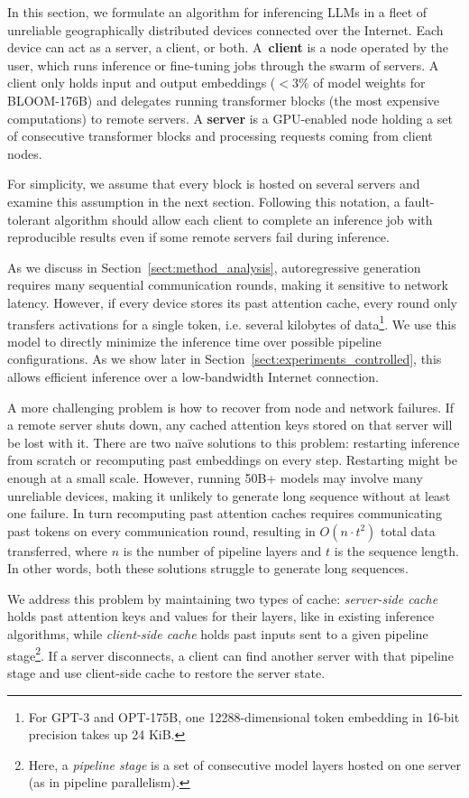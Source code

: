 In this section, we formulate an algorithm for inferencing LLMs in a fleet of unreliable geographically distributed devices connected over the Internet. Each device can act as a server, a client, or both. A~\textbf{client} is a node operated by the user, which runs inference or fine-tuning jobs through the swarm of servers. A client only holds input and output embeddings ($< 3\%$ of model weights for BLOOM-176B) and delegates running transformer blocks (the most expensive computations) to remote servers. A \textbf{server} is a GPU-enabled node holding a set of consecutive transformer blocks and processing requests coming from client nodes.

For simplicity, we assume that every block is hosted on several servers and examine this assumption in the next section. Following this notation, a fault-tolerant algorithm should allow each client to complete an inference job with reproducible results even if some remote servers fail during inference.

As we discuss in Section~\ref{sect:method_analysis}, autoregressive generation requires many sequential communication rounds, making it sensitive to network latency.
However, if every device stores its past attention cache, every round only transfers activations for a single token, i.e. several kilobytes of data\footnote{For GPT-3 and OPT-175B, one 12288-dimensional token embedding in 16-bit precision takes up 24 KiB.}. We use this model to directly minimize the inference time over possible pipeline configurations. As we show later in Section~\ref{sect:experiments_controlled}, this allows efficient inference over a low-bandwidth Internet connection.

A more challenging problem is how to recover from node and network failures. If a remote server shuts down, any cached attention keys stored on that server will be lost with it. There are two naïve solutions to this problem: restarting inference from scratch or recomputing past embeddings on every step. Restarting might be enough at a small scale. However, running 50B+ models may involve many unreliable devices, making it unlikely to generate long sequence without at least one failure. In turn recomputing past attention caches requires communicating past tokens on every communication round, resulting in $O(n \cdot t^2)$ total data transferred, where $n$ is the number of pipeline layers and $t$ is the sequence length. In other words, both these solutions struggle to generate long sequences.

We address this problem by maintaining two types of cache: \textit{server-side cache} holds past attention keys and values for their layers, like in existing inference algorithms, while \textit{client-side cache} holds past inputs sent to a given pipeline stage\footnote{Here, a \textit{pipeline stage} is a set of consecutive model layers hosted on one server (as in pipeline parallelism).}. If a server disconnects, a client can find another server with that pipeline stage and use client-side cache to restore the server state.

